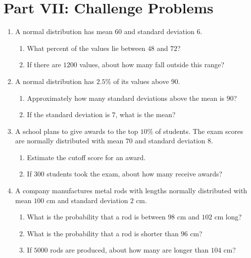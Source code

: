 \documentclass[11pt]{article}
\newcommand{\answerline}{\vspace{1.2cm}}
\begin{document}
\section{Part VII: Challenge Problems}

\begin{enumerate}[leftmargin=*, label=\textbf{\arabic*.}, start=23]

\item A normal distribution has mean $60$ and standard deviation $6$.
\begin{enumerate}[label=(\alph*)]
    \item What percent of the values lie between $48$ and $72$? \answerline
    \item If there are $1200$ values, about how many fall outside this range? \answerline
\end{enumerate}

\item A normal distribution has $2.5\%$ of its values above $90$.
\begin{enumerate}[label=(\alph*)]
    \item Approximately how many standard deviations above the mean is $90$? \answerline
    \item If the standard deviation is $7$, what is the mean? \answerline
\end{enumerate}

\item A school plans to give awards to the top $10\%$ of students.
The exam scores are normally distributed with mean $70$ and standard deviation $8$.
\begin{enumerate}[label=(\alph*)]
    \item Estimate the cutoff score for an award. \answerline
    \item If $300$ students took the exam, about how many receive awards? \answerline
\end{enumerate}

\item A company manufactures metal rods with lengths normally distributed with mean $100$ cm and standard deviation $2$ cm.
\begin{enumerate}[label=(\alph*)]
    \item What is the probability that a rod is between $98$ cm and $102$ cm long? \answerline
    \item What is the probability that a rod is shorter than $96$ cm? \answerline
    \item If $5000$ rods are produced, about how many are longer than $104$ cm? \answerline
\end{enumerate}

\end{enumerate}
\end{document}
